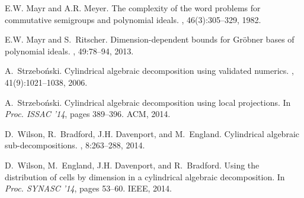 \documentclass{llncs}
\begin{document}
\begin{thebibliography}{10}
E.W. Mayr and A.R. Meyer.
\newblock The complexity of the word problems for commutative semigroups and
  polynomial ideals.
, 46(3):305--329, 1982.

E.W. Mayr and S.~Ritscher.
\newblock Dimension-dependent bounds for Gr\"{o}bner bases of polynomial
  ideals.
, 49:78--94, 2013.

A.~Strzebo\'{n}ski.
\newblock Cylindrical algebraic decomposition using validated numerics.
, 41(9):1021--1038, 2006.

A.~Strzebo\'{n}ski.
\newblock Cylindrical algebraic decomposition using local projections.
\newblock In {\em Proc. ISSAC '14}, pages 389--396. ACM,
  2014.

D.~Wilson, R.~Bradford, J.H. Davenport, and M.~England.
\newblock Cylindrical algebraic sub-decompositions.
, 8:263--288, 2014.

D.~Wilson, M.~England, J.H. Davenport, and R.~Bradford.
\newblock Using the distribution of cells by dimension in a cylindrical
  algebraic decomposition.
\newblock In {\em Proc. SYNASC '14}, pages 53--60. IEEE, 2014.

\end{thebibliography}
\end{document}
